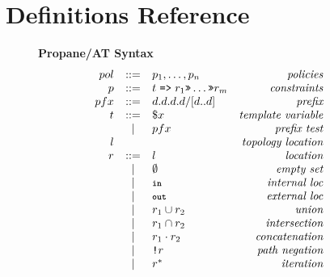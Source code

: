 \documentclass[twocolumn, openany]{sig-alternate-10pt}
\newcommand{\KW}[1]{\texttt{\small\bfseries{#1}}}
\newcommand{\Prefer}{\texttt{>>}}
\newcommand{\Path}{\texttt{=>}}
\newcommand{\In}{\KW{in}}
\newcommand{\Out}{\KW{out}}
\newcommand{\NOT}{\texttt{!}}
\newcommand{\BNFALT}{\;\;|\;\;}
\newcommand{\hdr}[2]{\flushleft \chdr{\hspace{5mm}#1}{#2}}
\newcommand{\chdr}[2]{\textbf{#1} {#2} \\ \centering}%
\begin{document}
\setlength{\pdfpageheight}{\paperheight}
\setlength{\pdfpagewidth}{\paperwidth}

\onecolumn

\appendix

\vspace{2em}
\section{Definitions Reference}

\begin{figure*}[h!]\small
  \begin{minipage}[t]{.45\linewidth}
  \hdr{Propane/AT Syntax}{}
  \vspace*{-1\baselineskip}
  \[ \begin{array}{rclr}
     pol     &::=& p_1, \dots, p_n & \textit{policies} \\
     p       &::=& t \hspace{.3em} \Path \hspace{.3em} r_1 \Prefer \dots \Prefer r_m & \textit{constraints} \\
     pfx     &::=& d.d.d.d/[d..d] & \textit{prefix} \\
     t       &::=& \$x & \textit{template variable} \\
         &\BNFALT& pfx & \textit{prefix test} \\
     l   & & & \textit{topology location} \\
     r       &::=& l & \textit{location} \\
         &\BNFALT& \emptyset & \textit{empty set} \\
         &\BNFALT& \In & \textit{internal loc} \\
         &\BNFALT& \Out & \textit{external loc} \\
         &\BNFALT& r_1 \cup r_2 & \textit{union} \\
         &\BNFALT& r_1 \cap r_2 & \textit{intersection} \\
         &\BNFALT& r_1 \cdot r_2 & \textit{concatenation} \\
         &\BNFALT& \NOT r & \textit{path negation} \\
         &\BNFALT& r^* & \textit{iteration} \\
  \end{array} \]%


\end{minipage}
\end{figure*}
\end{document}
